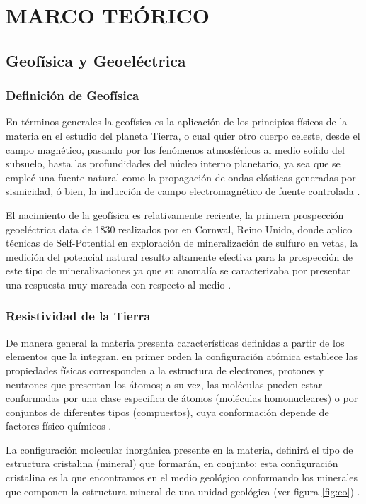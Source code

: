 \chapter{MARCO TEÓRICO}
	\section{Geofísica y Geoeléctrica}
		\subsection{Definición de Geofísica}
			
			En términos generales la geofísica es la aplicación de los principios físicos de la materia en el estudio del planeta Tierra, o cual quier otro cuerpo celeste, desde el campo magnético, pasando por los fenómenos atmosféricos al medio solido del subsuelo, hasta las profundidades del núcleo interno planetario, ya sea que se empleé una fuente natural como la propagación de ondas elásticas generadas por sismicidad, ó bien, la inducción de campo electromagnético de fuente controlada \citep{parasnis2012, reynolds2011, lay1995}.   
		
			El  nacimiento de la geofísica es relativamente reciente, la primera prospección geoeléctrica data de 1830 realizados por \cite{fox1830} en Cornwal, Reino Unido, donde aplico técnicas de Self-Potential en exploración de mineralización de sulfuro en vetas, la medición del potencial natural resulto altamente efectiva para la prospección de este tipo de mineralizaciones ya que su anomalía se caracterizaba por presentar una respuesta muy marcada con respecto al medio \citep{reynolds2011, revil2013}.
			
		\subsection{Resistividad de la Tierra}
				
			De manera general la materia presenta características definidas a partir de los elementos que la integran, en primer orden la configuración atómica establece las propiedades físicas corresponden a la estructura de electrones, protones y neutrones que presentan los átomos; a su vez, las moléculas pueden estar conformadas por una clase especifica de átomos (moléculas homonucleares) o por conjuntos de diferentes tipos (compuestos), cuya conformación depende de factores físico-químicos \citep{tiab2024}.
			
			La configuración molecular inorgánica presente en la materia, definirá el tipo de estructura cristalina (mineral) que formarán, en conjunto; esta configuración cristalina es la que encontramos en el medio geológico conformando los minerales que componen la estructura mineral de una unidad geológica (ver figura \ref{fig:eo}) \citep{gandhi2016, tiab2024}.\\
			
